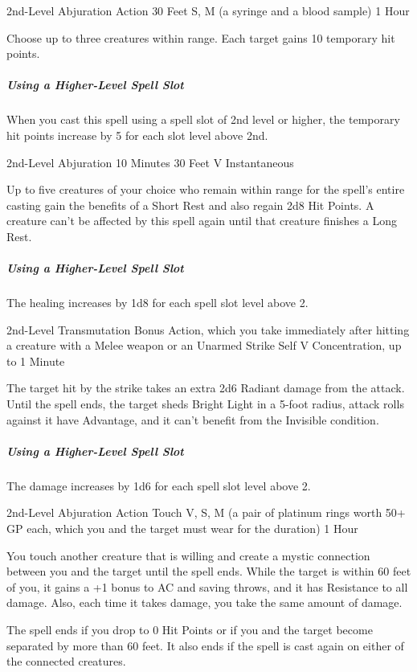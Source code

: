 \documentclass[letterpaper,openany,oneside,twocolumn]{book}
\begin{document}
	{2nd-Level Abjuration}
	{Action}
	{30 Feet}
	{S, M (a syringe and a blood sample)}
	{1 Hour}

Choose up to three creatures within range. Each target gains 10 temporary hit points.

\subparagraph*{Using a Higher-Level Spell Slot} When you cast this spell using a spell slot of 2nd level or higher, the temporary hit points increase by 5 for each slot level above 2nd.

	{2nd-Level Abjuration}
	{10 Minutes}
	{30 Feet}
	{V}
	{Instantaneous}

Up to five creatures of your choice who remain within range for the spell's entire casting gain the benefits of a Short Rest and also regain 2d8 Hit Points. A creature can't be affected by this spell again until that creature finishes a Long Rest.

\subparagraph*{Using a Higher-Level Spell Slot} The healing increases by 1d8 for each spell slot level above 2.

	{2nd-Level Transmutation}
	{Bonus Action, which you take immediately after hitting a creature with a Melee weapon or an Unarmed Strike}
	{Self}
	{V}
	{Concentration, up to 1 Minute}

The target hit by the strike takes an extra 2d6 Radiant damage from the attack. Until the spell ends, the target sheds Bright Light in a 5-foot radius, attack rolls against it have Advantage, and it can't benefit from the Invisible condition.

\subparagraph*{Using a Higher-Level Spell Slot} The damage increases by 1d6 for each spell slot level above 2.

	{2nd-Level Abjuration}
	{Action}
	{Touch}
	{V, S, M (a pair of platinum rings worth 50+ GP each, which you and the target must wear for the duration)}
	{1 Hour}

You touch another creature that is willing and create a mystic connection between you and the target until the spell ends. While the target is within 60 feet of you, it gains a +1 bonus to AC and saving throws, and it has Resistance to all damage. Also, each time it takes damage, you take the same amount of damage.

The spell ends if you drop to 0 Hit Points or if you and the target become separated by more than 60 feet. It also ends if the spell is cast again on either of the connected creatures.
\end{document}

